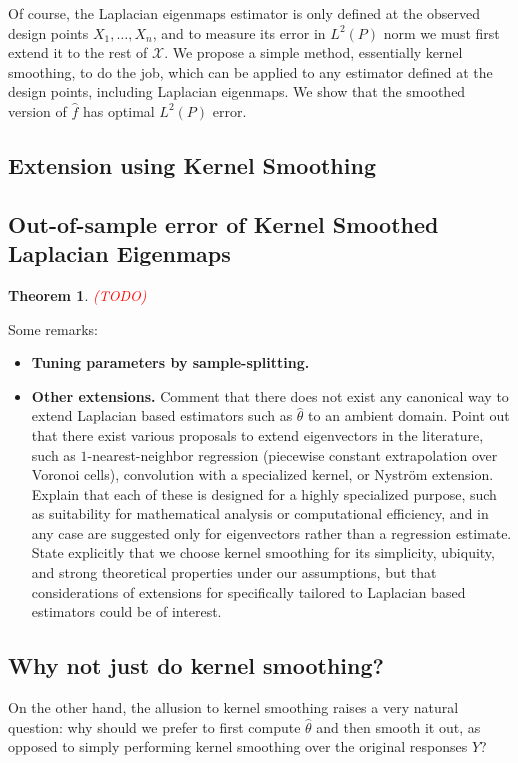 \documentclass{article}
\newcommand{\1}{\mathbf{1}}
\newcommand{\Xset}{\mathcal{X}}
\newcommand{\wh}[1]{\widehat{#1}}
\theoremstyle{alden}
\theoremstyle{aldenthm}
\newtheorem{theorem}{Theorem}
\theoremstyle{definition}
\theoremstyle{remark}
\begin{document}
Of course, the Laplacian eigenmaps estimator is only defined at the observed design points $X_1,\ldots,X_n$, and to measure its error in $L^2(P)$ norm we must first extend it to the rest of $\Xset$. We propose a simple method, essentially kernel smoothing, to do the job, which can be applied to any estimator defined at the design points, including Laplacian eigenmaps. We show that the smoothed version of $\wh{f}$ has optimal $L^2(P)$ error. 

\subsection{Extension using Kernel Smoothing}

\subsection{Out-of-sample error of Kernel Smoothed Laplacian Eigenmaps}

\begin{theorem}
	\label{thm:kernel_smoothing}
	\textcolor{red}{(TODO)}
\end{theorem}

Some remarks:
\begin{itemize}
	\item \textbf{Tuning parameters by sample-splitting.}
	\item \textbf{Other extensions.} Comment that there does not exist any canonical way to extend Laplacian based estimators such as $\wh{\theta}$ to an ambient domain. Point out that there exist various proposals to extend eigenvectors in the literature, such as $1$-nearest-neighbor regression (piecewise constant extrapolation over Voronoi cells), convolution with a specialized kernel, or Nystr\"{o}m extension. Explain that each of these is designed for a highly specialized purpose, such as suitability for mathematical analysis or computational efficiency, and in any case are suggested only for eigenvectors rather than a regression estimate. State explicitly that we choose kernel smoothing for its simplicity, ubiquity, and strong theoretical properties under our assumptions, but that considerations of extensions for specifically tailored to Laplacian based estimators could be of interest.
\end{itemize}


\subsection{Why not just do kernel smoothing?}
On the other hand, the allusion to kernel smoothing raises a very natural question: why should we prefer to first compute $\wh{\theta}$ and then smooth it out, as opposed to simply performing kernel smoothing over the original responses $Y$?
\end{document}
